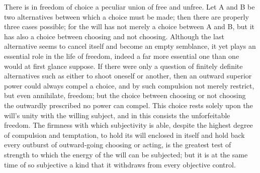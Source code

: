 \documentclass[12pt]{book}
\begin{document}
There is in freedom of choice a peculiar union of free and unfree. Let A and B be two
alternatives between which a choice must be made; then there are properly three cases possible;
for the will has not merely a choice between A and B, but it has also a choice between choosing
and not choosing. Although the last alternative seems to cancel itself and become an empty
semblance, it yet plays an essential role in the life of freedom, indeed a far more essential
one than one would at first glance suppose. If there were only a question of finitely definite
alternatives such as either to shoot oneself or another, then an outward superior power could
always compel a choice, and by such compulsion not merely restrict, but even annihilate,
freedom; but the choice between choosing or not choosing the outwardly prescribed no power can
compel. This choice rests solely upon the will's unity with the willing subject, and in this
consists the unforfeitable freedom. The firmness with which subjectivity is able, despite the
highest degree of compulsion and temptation, to hold its will enclosed in itself and hold back
every outburst of outward-going choosing or acting, is the greatest test of strength to which
the energy of the will can be subjected; but it is at the same time of so subjective a kind that
it withdraws from every objective control.
\end{document}
